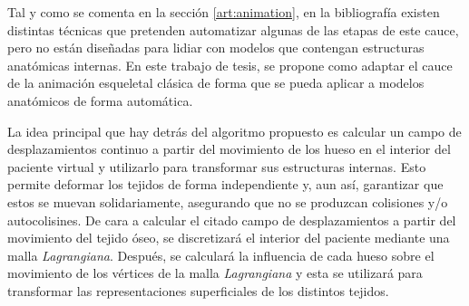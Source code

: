 Tal y como se comenta en la sección \ref{art:animation}, en la bibliografía existen distintas técnicas que pretenden automatizar algunas de las etapas de este cauce, pero no están diseñadas para lidiar con modelos que contengan estructuras anatómicas internas. En este trabajo de tesis, se propone como adaptar el cauce de la animación esqueletal clásica de forma que se pueda aplicar a modelos anatómicos de forma automática. 

La idea principal que hay detrás del algoritmo propuesto es  calcular un campo de desplazamientos continuo a partir del movimiento de los hueso
en el interior del paciente virtual y utilizarlo para transformar sus estructuras internas. Esto permite deformar los tejidos de forma independiente y, aun así, garantizar que estos se muevan solidariamente, asegurando que no se produzcan colisiones y/o autocolisines. %
%
De cara a calcular el citado campo de desplazamientos a partir del movimiento del tejido óseo, se discretizará el interior del paciente mediante una malla \emph{Lagrangiana}. Después, se calculará la influencia de cada hueso sobre el movimiento de los vértices de la malla \emph{Lagrangiana} y esta se utilizará para transformar las representaciones superficiales de los distintos tejidos. 

